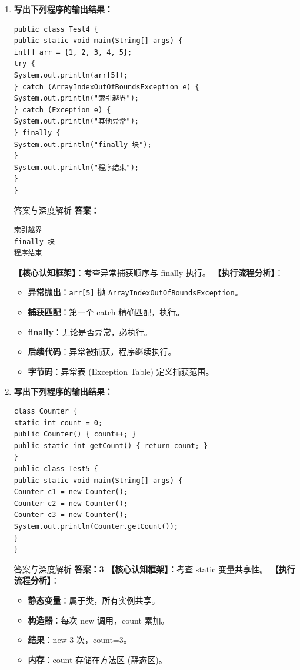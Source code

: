 \documentclass[12pt, a4paper]{ctexart}
\newcommand{\code}[1]{\texttt{\color{myblue}#1}}
\begin{document}
\begin{enumerate}[label=\arabic*.]
	\item \textbf{写出下列程序的输出结果：}
	      \begin{lstlisting}
public class Test4 {
public static void main(String[] args) {
int[] arr = {1, 2, 3, 4, 5};
try {
System.out.println(arr[5]);
} catch (ArrayIndexOutOfBoundsException e) {
System.out.println("索引越界");
} catch (Exception e) {
System.out.println("其他异常");
} finally {
System.out.println("finally 块");
}
System.out.println("程序结束");
}
}
\end{lstlisting}
	      \begin{bluebox}{答案与深度解析}
		      \textbf{答案：}
		      \begin{lstlisting}
索引越界
finally 块
程序结束
\end{lstlisting}
		      \textbf{【核心认知框架】}：考查异常捕获顺序与 finally 执行。
		      \textbf{【执行流程分析】}：
		      \begin{itemize}[leftmargin=*, nosep]
			      \item \textbf{异常抛出}：\code{arr[5]} 抛 \code{ArrayIndexOutOfBoundsException}。
			      \item \textbf{捕获匹配}：第一个 catch 精确匹配，执行。
			      \item \textbf{finally}：无论是否异常，必执行。
			      \item \textbf{后续代码}：异常被捕获，程序继续执行。
			      \item \textbf{字节码}：异常表 (Exception Table) 定义捕获范围。
		      \end{itemize}
	      \end{bluebox}

	\item \textbf{写出下列程序的输出结果：}
	      \begin{lstlisting}
class Counter {
static int count = 0;
public Counter() { count++; }
public static int getCount() { return count; }
}
public class Test5 {
public static void main(String[] args) {
Counter c1 = new Counter();
Counter c2 = new Counter();
Counter c3 = new Counter();
System.out.println(Counter.getCount());
}
}
\end{lstlisting}
	      \begin{bluebox}{答案与深度解析}
		      \textbf{答案：3}
		      \textbf{【核心认知框架】}：考查 static 变量共享性。
		      \textbf{【执行流程分析】}：
		      \begin{itemize}[leftmargin=*, nosep]
			      \item \textbf{静态变量}：属于类，所有实例共享。
			      \item \textbf{构造器}：每次 new 调用，count 累加。
			      \item \textbf{结果}：new 3 次，count=3。
			      \item \textbf{内存}：count 存储在方法区 (静态区)。
		      \end{itemize}
	      \end{bluebox}
\end{enumerate}
\end{document}
